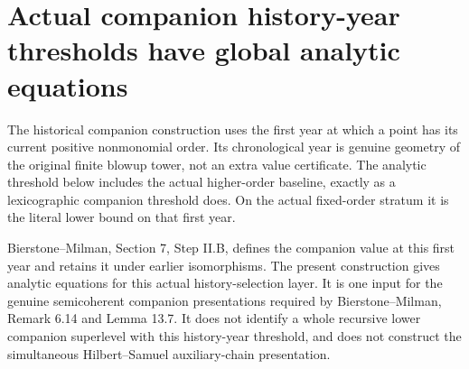 \section{Actual companion history-year thresholds have global analytic equations}

The historical companion construction uses the first year at which a point
has its current positive nonmonomial order. Its chronological year is genuine
geometry of the original finite blowup tower, not an extra value certificate.
The analytic threshold below includes the actual higher-order baseline,
exactly as a lexicographic companion threshold does. On the actual fixed-order
stratum it is the literal lower bound on that first year.

Bierstone--Milman\cite{bierstone-milman08-functoriality}, Section 7, Step II.B,
defines the companion value at this first year and retains it under earlier
isomorphisms. The present construction gives analytic equations for this actual
history-selection layer. It is one input for the genuine semicoherent
companion presentations required by Bierstone--Milman\cite{bierstone-milman97-invent-math},
Remark 6.14 and Lemma 13.7. It does not identify a whole recursive lower
companion superlevel with this history-year threshold, and does not construct
the simultaneous Hilbert--Samuel auxiliary-chain presentation.

